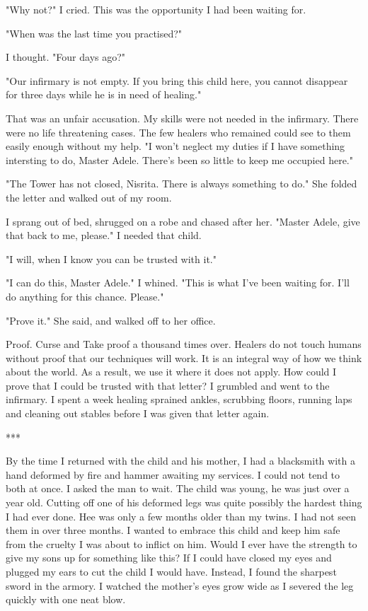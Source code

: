 \documentclass{article}
\begin{document}
"Why not?" I cried. This was the opportunity I had been waiting for. 

"When was the last time you practised?" 

I thought. "Four days ago?"

"Our infirmary is not empty. If you bring this child here, you cannot disappear for three days while he is in need of healing." 

That was an unfair accusation. My skills were not needed in the infirmary. There were no life threatening cases. The few healers who remained could see to them easily enough without my help. "I won't neglect my duties if I have something intersting to do, Master Adele. There's been so little to keep me occupied here."

"The Tower has not closed, Nisrita. There is always something to do." She folded the letter and walked out of my room. 

I sprang out of bed, shrugged on a robe and chased after her. "Master Adele, give that back to me, please." I needed that child. 

"I will, when I know you can be trusted with it."

"I can do this, Master Adele." I whined. "This is what I've been waiting for. I'll do anything for this chance. Please."

"Prove it." She said, and walked off to her office. 

Proof. Curse and Take proof a thousand times over. Healers do not touch humans without proof that our techniques will work. It is an integral way of how we think about the world. As a result, we use it where it does not apply. How could I prove that I could be trusted with that letter? I grumbled and went to the infirmary. I spent a week healing sprained ankles, scrubbing floors, running laps and cleaning out stables before I was given that letter again.

***

By the time I returned with the child and his mother, I had a blacksmith with a hand deformed by fire and hammer awaiting my services. I could not tend to both at once. I asked the  man to wait. The child was young, he was just over a year old. Cutting off one of his deformed legs was quite possibly the hardest thing I had ever done. Hee was only a few months older than my twins. I had not seen them in over three months. I wanted to embrace this child and keep him safe from the cruelty I was about to inflict on him. Would I ever have the strength to give my sons up for something like this? If I could have closed my eyes and plugged my ears to cut the child I would have. Instead, I found the sharpest sword in the armory. I watched the mother's eyes grow wide as I severed the leg quickly with one neat blow.
\end{document}
